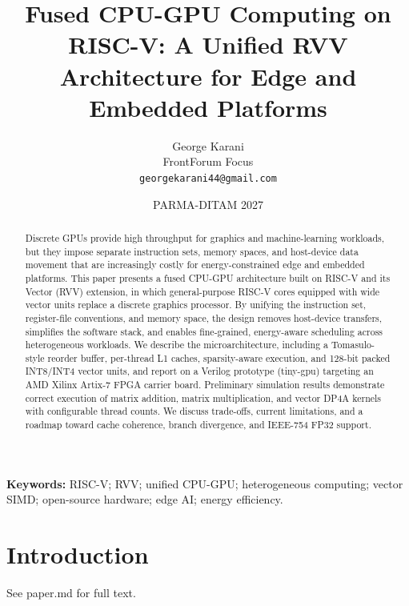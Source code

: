 \documentclass[11pt]{article}
\title{Fused CPU-GPU Computing on RISC-V: A Unified RVV Architecture for Edge and Embedded Platforms}
\author{George Karani\\FrontForum Focus\\\texttt{georgekarani44@gmail.com}}
\date{PARMA-DITAM 2027}
\begin{document}
\maketitle
\begin{abstract}
Discrete GPUs provide high throughput for graphics and machine-learning workloads, but they impose separate instruction sets, memory spaces, and host-device data movement that are increasingly costly for energy-constrained edge and embedded platforms. This paper presents a fused CPU-GPU architecture built on RISC-V and its Vector (RVV) extension, in which general-purpose RISC-V cores equipped with wide vector units replace a discrete graphics processor. By unifying the instruction set, register-file conventions, and memory space, the design removes host-device transfers, simplifies the software stack, and enables fine-grained, energy-aware scheduling across heterogeneous workloads. We describe the microarchitecture, including a Tomasulo-style reorder buffer, per-thread L1 caches, sparsity-aware execution, and 128-bit packed INT8/INT4 vector units, and report on a Verilog prototype (tiny-gpu) targeting an AMD Xilinx Artix-7 FPGA carrier board. Preliminary simulation results demonstrate correct execution of matrix addition, matrix multiplication, and vector DP4A kernels with configurable thread counts. We discuss trade-offs, current limitations, and a roadmap toward cache coherence, branch divergence, and IEEE-754 FP32 support.
\end{abstract}
\noindent\textbf{Keywords:} RISC-V; RVV; unified CPU-GPU; heterogeneous computing; vector SIMD; open-source hardware; edge AI; energy efficiency.

\section{Introduction}
See paper.md for full text.
\end{document}
